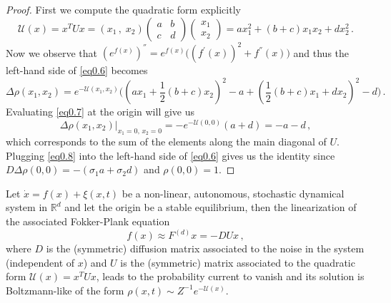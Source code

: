 \documentclass[../main.tex]{subfiles}
\begin{document}
\begin{proof}
     First we compute the quadratic form explicitly
     \begin{equation*}
          \mathcal{U}(x)=x^{T}Ux=(x_{1}\,,\;x_{2})\begin{pmatrix}
                  a & b \\
                  c & d
          \end{pmatrix}\begin{pmatrix}
               x_{1} \\
               x_{2}
          \end{pmatrix} = ax_{1}^{2}+(b+c)x_{1}x_{2}+dx_{2}^{2}\,.
     \end{equation*}
     Now we observe that $(e^{f(x)})^{''}=e^{f(x)}\Big((f^{'}(x))^{2}+f^{''}(x)\Big)$ and thus the left-hand side of \eqref{eq0.6} becomes
     \begin{equation}\label{eq0.7}
          \Delta \rho(x_{1}, x_{2}) = e^{-\mathcal{U}(x_{1},x_{2})}\bigg((a x_{1}+ \frac{1}{2}(b+c)x_{2})^{2}-a+(\frac{1}{2}(b+c)x_{1}+d x_{2})^{2}-d\bigg)\,.
     \end{equation}
     Evaluating \eqref{eq0.7} at the origin will give us
     \begin{equation}\label{eq0.8}
          \left.\Delta\rho(x_{1}, x_{2})\right|_{x_{1}=0,\,x_{2}=0}=-e^{- \mathcal{U}(0,0)}(a+d)=-a - d\,,
     \end{equation}
     which corresponds to the sum of the elements along the main diagonal of $U$. Plugging \eqref{eq0.8} into the left-hand side of \eqref{eq0.6} gives us the identity since $D\Delta\rho(0,0)= -(\sigma_{1}a+\sigma_{2}d)$ and $\rho(0,0)=1$. 
     \end{proof}
     \begin{theorem}[label=thm1]{}{}
             Let $\dot{x}=f(x) + \xi(x,t)$ be a non-linear, autonomous, stochastic dynamical system in $\mathbb{R}^{d}$ and let the origin be a stable equilibrium, then the linearization of the associated Fokker-Plank equation 
             \begin{equation*}
                  f(x)\approx F^{(d)}x=-DUx\,,
             \end{equation*}
             where $D$ is the (symmetric) diffusion matrix associated to the noise in the system (independent of $x$) and $U$ is the (symmetric) matrix associated to the quadratic form $\mathcal{U}(x)=x^{T}Ux$, leads to the probability current to vanish and its solution is Boltzmann-like of the form $\rho(x,t)\sim Z^{-1}e^{-\mathcal{U}(x)}$. 
     \end{theorem}
\end{document}
